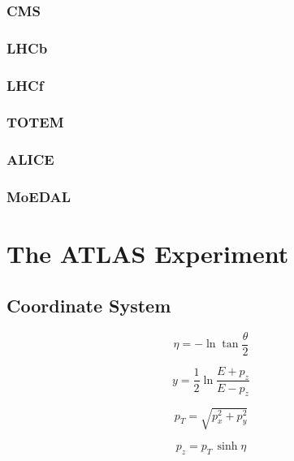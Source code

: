 \subsubsection*{CMS}

\subsubsection*{LHCb}

\subsubsection*{LHCf}

\subsubsection*{TOTEM}

\subsubsection*{ALICE}

\subsubsection*{MoEDAL}



\section{The ATLAS Experiment}
\label{sed:cern:atlas}

\subsection{Coordinate System}

\begin{equation}
\label{eq:cern:eta}
\eta = - \ln \tan \frac{\theta}{2}
\end{equation}

\begin{equation}
\label{eq:cern:y}
y = \frac{1}{2} \ln \frac{E + p_z}{E - p_z}
\end{equation}

\begin{equation}
\label{eq:cern:pt}
p_T = \sqrt{p_x^2 + p_y^2}
\end{equation}

\begin{equation}
\label{eq:cern:pz}
p_z = p_T \,\sinh \eta
\end{equation}


